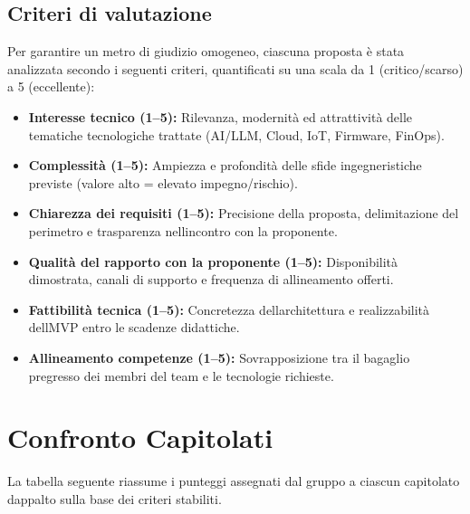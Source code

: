 \documentclass[12pt,a4paper]{article}
\newcommand{\tightlist}{\setlength{\itemsep}{1pt}\setlength{\parskip}{0pt}}
\begin{document}
\hypertarget{criteri-di-valutazione}{%
\subsection{Criteri di valutazione}}
Per garantire un metro di giudizio omogeneo, ciascuna proposta è stata analizzata secondo i seguenti criteri, quantificati su una scala da 1 (critico/scarso) a 5 (eccellente):
\begin{itemize}
\tightlist
\item \textbf{Interesse tecnico (1--5):} Rilevanza, modernità ed attrattività delle tematiche tecnologiche trattate (AI/LLM, Cloud, IoT, Firmware, FinOps).
\item \textbf{Complessità (1--5):} Ampiezza e profondità delle sfide ingegneristiche previste (valore alto = elevato impegno/rischio).
\item \textbf{Chiarezza dei requisiti (1--5):} Precisione della proposta, delimitazione del perimetro e trasparenza nell\textquotesingle{}incontro con la proponente.
\item \textbf{Qualità del rapporto con la proponente (1--5):} Disponibilità dimostrata, canali di supporto e frequenza di allineamento offerti.
\item \textbf{Fattibilità tecnica (1--5):} Concretezza dell\textquotesingle{}architettura e realizzabilità dell\textquotesingle{}MVP entro le scadenze didattiche.
\item \textbf{Allineamento competenze (1--5):} Sovrapposizione tra il bagaglio pregresso dei membri del team e le tecnologie richieste.
\end{itemize}

\hypertarget{confronto-capitolati}{%
\section{Confronto Capitolati}}

La tabella seguente riassume i punteggi assegnati dal gruppo a ciascun capitolato d\textquotesingle{}appalto sulla base dei criteri stabiliti.
\end{document}
